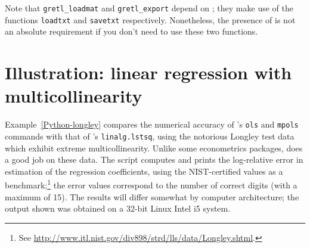 Note that \verb|gretl_loadmat| and \verb|gretl_export| depend on
; they make use of the functions \texttt{loadtxt} and
\texttt{savetxt} respectively. Nonetheless, the presence of
 is not an absolute requirement if you don't need
to use these two functions.

\section{Illustration: linear regression with multicollinearity}
\label{sec:Python-longley}

Example~\ref{Python-longley} compares the numerical accuracy of
's \texttt{ols} and \texttt{mpols} commands with that of
's \texttt{linalg.lstsq}, using the notorious Longley test
data which exhibit extreme multicollinearity.  Unlike some
econometrics packages,  does a good job on these data. The
script computes and prints the log-relative error in estimation of the
regression coefficients, using the NIST-certified values as a
benchmark;\footnote{See
  \url{http://www.itl.nist.gov/div898/strd/lls/data/Longley.shtml}.}
the error values correspond to the number of correct digits (with a
maximum of 15). The results will differ somewhat by computer
architecture; the output shown was obtained on a 32-bit Linux Intel i5
system.

